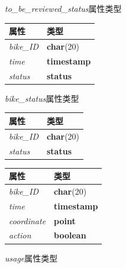 \begin{figure}[!htp]
    \begin{minipage}{0.33\textwidth}
      \centering
      \caption{\textit{to\_be\_reviewed\_status}属性类型}
      \label{tab:tobereviewedstatus}
      \begin{tabular}{ll}\toprule
        属性&类型\\\midrule
       \textit{bike\_ID}&\textbf{char}(20)\\
       \textit{time}&\textbf{timestamp}\\
       \textit{status}&\textbf{status}\\
       \bottomrule
      \end{tabular}



    \end{minipage}\hfill
    \begin{minipage}{0.33\textwidth}
      \centering
      \caption{\textit{bike\_status}属性类型}
      \label{tab:bikestatus}
      \begin{tabular}{ll}\toprule
        属性&类型\\\midrule
       \textit{bike\_ID}&\textbf{char}(20)\\
       \textit{status}&\textbf{status}\\
       \bottomrule
      \end{tabular}
    \end{minipage}\hfill
    \begin{minipage}{0.33\textwidth}
      \centering
      \caption{\textit{usage}属性类型}
      \label{tab:usage}
      \begin{tabular}{ll}\toprule
        属性&类型\\\midrule
       \textit{bike\_ID}&\textbf{char}(20)\\
       \textit{time}&\textbf{timestamp}\\
       \textit{coordinate}&\textbf{point}\\
       \textit{action}&\textbf{boolean}\\
       \bottomrule
      \end{tabular}
    \end{minipage}\hfill
  \end{figure}

